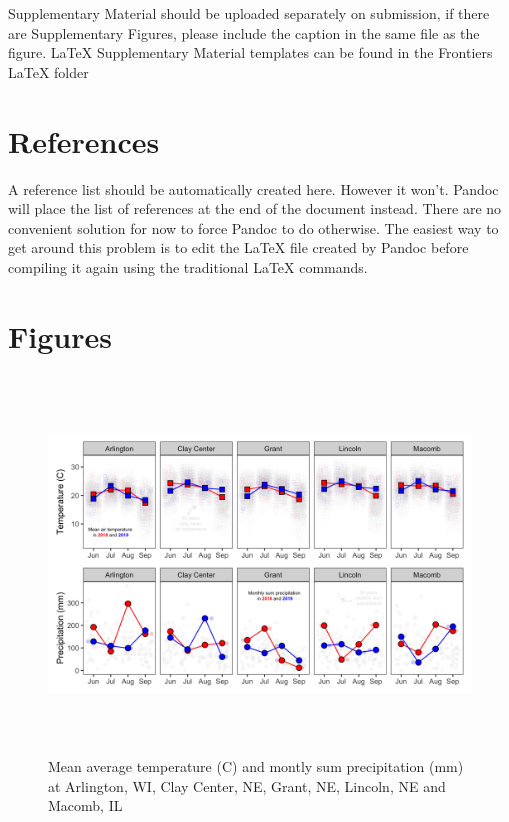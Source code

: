 \documentclass[utf8]{frontiersSCNS}
\begin{document}
Supplementary Material should be uploaded separately on submission, if
there are Supplementary Figures, please include the caption in the same
file as the figure. LaTeX Supplementary Material templates can be found
in the Frontiers LaTeX folder

\hypertarget{references}{%
\section{References}\label{references}}

A reference list should be automatically created here. However it won't.
Pandoc will place the list of references at the end of the document
instead. There are no convenient solution for now to force Pandoc to do
otherwise. The easiest way to get around this problem is to edit the
LaTeX file created by Pandoc before compiling it again using the
traditional LaTeX commands.

\hypertarget{figures}{%
\section*{Figures}\label{figures}}

\begin{figure}

{\centering \includegraphics[width=160mm,height=100mm]{../data analysis/weather/Figure 1} 

}

\caption{Mean average temperature (C) and montly sum precipitation (mm) at Arlington, WI, Clay Center, NE, Grant, NE, Lincoln, NE and Macomb, IL}\label{fig:Figure-1}
\end{figure}
\end{document}
